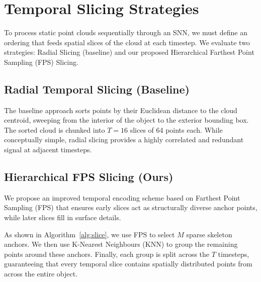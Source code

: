 \documentclass[11pt,a4paper]{article}
\begin{document}
\section{Temporal Slicing Strategies}

To process static point clouds sequentially through an SNN, we must define an
ordering that feeds spatial slices of the cloud at each timestep. We evaluate
two strategies: Radial Slicing (baseline) and our proposed Hierarchical
Farthest Point Sampling (FPS) Slicing.

\subsection{Radial Temporal Slicing (Baseline)}

The baseline approach sorts points by their Euclidean distance to the cloud
centroid, sweeping from the interior of the object to the exterior bounding
box. The sorted cloud is chunked into $T = 16$ slices of 64 points each.
While conceptually simple, radial slicing provides a highly correlated and
redundant signal at adjacent timesteps.

\subsection{Hierarchical FPS Slicing (Ours)}

We propose an improved temporal encoding scheme based on Farthest Point Sampling
(FPS) that ensures early slices act as structurally diverse anchor points, while
later slices fill in surface details.

As shown in Algorithm~\ref{alg:slice}, we use FPS to select $M$ sparse skeleton
anchors. We then use K-Nearest Neighbours (KNN) to group the remaining points
around these anchors. Finally, each group is split across the $T$ timesteps,
guaranteeing that every temporal slice contains spatially distributed points
from across the entire object.

\begin{algorithm}[H]
  \centering
  \caption{Our proposed Hierarchical FPS slicing strategy.}
  \label{alg:slice}
\end{algorithm}
\end{document}

